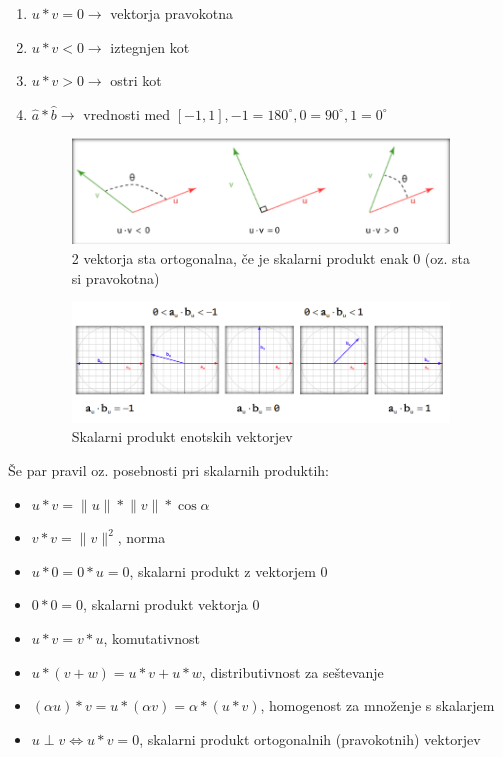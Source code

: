 \documentclass{article}
\begin{document}
\begin{itemize}
\begin{enumerate}
    \item $u*v = 0 \to$ vektorja pravokotna
    \item $u*v < 0 \to$ iztegnjen kot
    \item $u*v > 0 \to$ ostri kot
    \item $\hat{a} * \hat{b} \to$ vrednosti med $[-1, 1],-1 = 180^\circ, 0 = 90^\circ, 1 = 0^\circ$
\begin{figure}[H]
\centering
\includegraphics[width=100mm]{src/ortogonalnost.png}
\caption{2 vektorja sta ortogonalna, če je skalarni produkt enak 0 (oz. sta si pravokotna)}
\end{figure}
\begin{figure}[H]
\centering
\includegraphics[width=100mm]{src/skalarni_produkt_enotskih_vektorjev.png}
\caption{Skalarni produkt enotskih vektorjev}
\end{figure}
\end{enumerate}
Še par pravil oz. posebnosti pri skalarnih produktih:
\begin{itemize}
    \item $u * v = \lVert u \rVert * \lVert v \rVert * \cos{\alpha}$
    \item $v * v = \lVert v  \rVert^2$, norma
    \item $u * 0 = 0 * u = 0$, skalarni produkt z vektorjem 0
    \item $0 * 0 = 0$, skalarni produkt vektorja 0
    \item $u * v = v * u$, komutativnost
    \item $u * (v+w) = u*v + u*w$, distributivnost za seštevanje
    \item $(\alpha u)*v = u * (\alpha v) = \alpha * (u * v)$, homogenost za množenje s skalarjem
    \item $u \perp v \iff u * v = 0$, skalarni produkt ortogonalnih (pravokotnih) vektorjev

\end{itemize}
\end{itemize}
\end{document}
